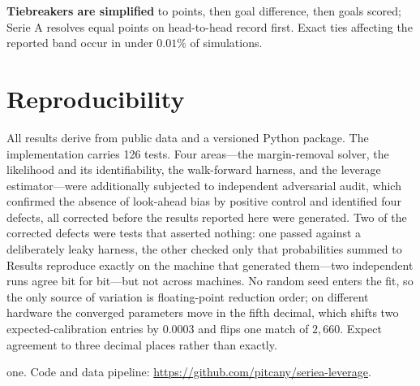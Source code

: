 \documentclass[11pt]{article}
\begin{document}
\textbf{Tiebreakers are simplified} to points, then goal difference, then goals
scored; Serie A resolves equal points on head-to-head record first. Exact ties
affecting the reported band occur in under $0.01\%$ of simulations.

\section{Reproducibility}

All results derive from public data and a versioned Python package. The
implementation carries 126 tests. Four areas---the margin-removal solver, the
likelihood and its identifiability, the walk-forward harness, and the leverage
estimator---were additionally subjected to independent adversarial audit, which
confirmed the absence of look-ahead bias by positive control and identified four
defects, all corrected before the results reported here were generated. Two of
the corrected defects were tests that asserted nothing: one passed against a
deliberately leaky harness, the other checked only that probabilities summed to
Results reproduce exactly on the machine that generated them---two independent
runs agree bit for bit---but not across machines. No random seed enters the
fit, so the only source of variation is floating-point reduction order; on
different hardware the converged parameters move in the fifth decimal, which
shifts two expected-calibration entries by $0.0003$ and flips one match of
$2{,}660$. Expect agreement to three decimal places rather than exactly.

one. Code and data pipeline: \url{https://github.com/pitcany/seriea-leverage}.
\end{document}
